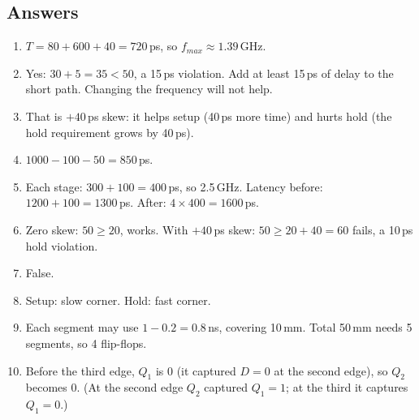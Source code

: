 \subsection*{Answers}
\begin{enumerate}
  \item $T = 80 + 600 + 40 = 720$\,ps, so $f_{max} \approx 1.39$\,GHz.
  \item Yes: $30 + 5 = 35 < 50$, a 15\,ps violation. Add at least 15\,ps of delay to the short path. Changing the frequency will not help.
  \item That is $+40$\,ps skew: it helps setup (40\,ps more time) and hurts hold (the hold requirement grows by 40\,ps).
  \item $1000 - 100 - 50 = 850$\,ps.
  \item Each stage: $300 + 100 = 400$\,ps, so 2.5\,GHz. Latency before: $1200 + 100 = 1300$\,ps. After: $4 \times 400 = 1600$\,ps.
  \item Zero skew: $50 \ge 20$, works. With $+40$\,ps skew: $50 \ge 20 + 40 = 60$ fails, a 10\,ps hold violation.
  \item False.
  \item Setup: slow corner. Hold: fast corner.
  \item Each segment may use $1 - 0.2 = 0.8$\,ns, covering 10\,mm. Total 50\,mm needs 5 segments, so 4 flip-flops.
  \item Before the third edge, $Q_1$ is 0 (it captured $D = 0$ at the second edge), so $Q_2$ becomes 0. (At the second edge $Q_2$ captured $Q_1 = 1$; at the third it captures $Q_1 = 0$.)
\end{enumerate}
